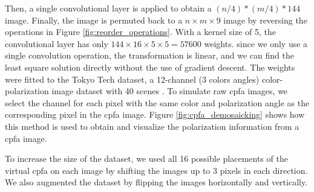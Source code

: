 Then, a single convolutional layer is applied to obtain a $(n/4)*(m/4)*144$ image.
Finally, the image is permuted back to a $n \times m \times 9$ image by reversing the operations in Figure \ref{fig:reorder_operations}.
With a kernel size of 5, the convolutional layer has only $144\times16\times5\times5=57600$ weights.
since we only use a single convolution operation, the transformation is linear, and we can find the least square solution directly without the use of gradient descent.
The weights were fitted to the Tokyo Tech dataset, a 12-channel (3 colors  angles) color-polarization image dataset with 40 scenes \cite{morimatsuMonochromeColorPolarization2020}\cite{morimatsuMonochromeColorPolarization2021}.
To simulate raw \gls{cpfa} images, we select the channel for each pixel with the same color and polarization angle as the corresponding pixel in the \gls{cpfa} image.
Figure \ref{fig:cpfa_demosaicking} shows how this method is used to obtain and visualize the polarization information from a \gls{cpfa} image.

To increase the size of the dataset, we used all 16 possible placements of the virtual \gls{cpfa} on each image by shifting the images up to 3 pixels in each direction.
We also augmented the dataset by flipping the images horizontally and vertically.


